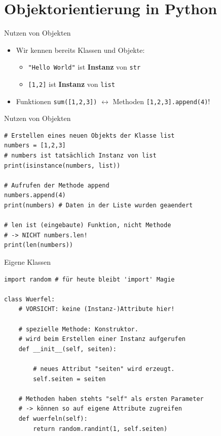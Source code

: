 \section{Objektorientierung in Python}
\begin{frame}{Nutzen von Objekten}
    \begin{itemize}
        \item Wir kennen bereits Klassen und Objekte:
        \begin{itemize}
            \item \texttt{"Hello World"} ist \textbf{Instanz} von \texttt{str}
            \item \texttt{[1,2]} ist \textbf{Instanz} von \texttt{list}
        \end{itemize}
        \item Funktionen \texttt{sum([1,2,3])} $\leftrightarrow$ Methoden \texttt{[1,2,3].append(4)}!
    \end{itemize} 
\end{frame}

\begin{frame}[fragile]{Nutzen von Objekten}
\begin{lstlisting}
# Erstellen eines neuen Objekts der Klasse list
numbers = [1,2,3]
# numbers ist tatsächlich Instanz von list
print(isinstance(numbers, list))

# Aufrufen der Methode append
numbers.append(4)
print(numbers) # Daten in der Liste wurden geaendert

# len ist (eingebaute) Funktion, nicht Methode
# -> NICHT numbers.len!
print(len(numbers))
\end{lstlisting}
\end{frame}

\begin{frame}[fragile]{Eigene Klassen}
\begin{lstlisting}
import random # für heute bleibt 'import' Magie

class Wuerfel:
    # VORSICHT: keine (Instanz-)Attribute hier!

    # spezielle Methode: Konstruktor. 
    # wird beim Erstellen einer Instanz aufgerufen
    def __init__(self, seiten):

        # neues Attribut "seiten" wird erzeugt.
        self.seiten = seiten

    # Methoden haben stehts "self" als ersten Parameter
    # -> können so auf eigene Attribute zugreifen
    def wuerfeln(self):
        return random.randint(1, self.seiten)
\end{lstlisting}
\end{frame}

